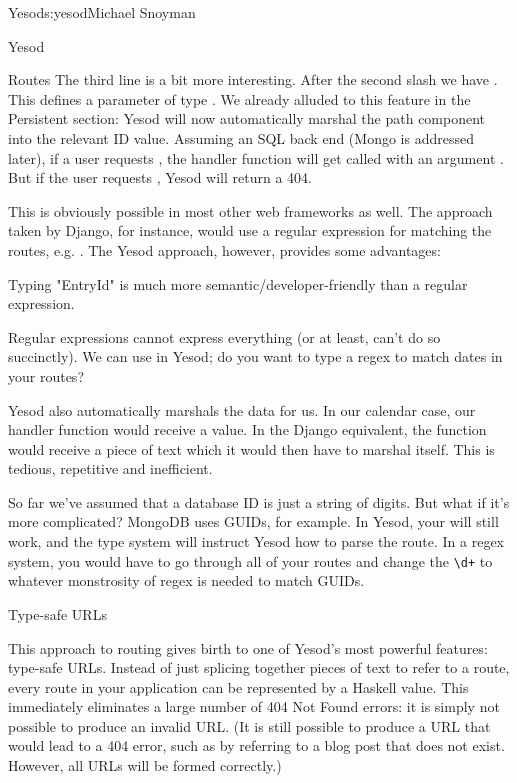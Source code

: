\begin{aosachapter}{Yesod}{s:yesod}{Michael Snoyman}
\begin{aosasect1}{Yesod}
\begin{aosasect2}{Routes}
The third line is a bit more interesting. After the second slash we
have . This defines a parameter of type
. We already alluded to this
feature in the Persistent section: Yesod will now automatically marshal the path component into
the relevant ID value. Assuming an SQL back end (Mongo is addressed
later), if a user requests , the handler function will
get called with an argument . But if the user requests
, Yesod will return a 404.

This is obviously possible in most other web frameworks as well. The
approach taken by Django, for instance, would use a regular expression
for matching the routes, e.g. . The Yesod
approach, however, provides some advantages:

\begin{aosaitemize}

\item Typing "EntryId" is much more semantic/developer-friendly than a
  regular expression.

\item Regular expressions cannot express everything (or at least,
  can't do so succinctly). We can use  in Yesod;
  do you want to type a regex to match dates in your routes?

\item Yesod also automatically marshals the data for us. In our
  calendar case, our handler function would receive a 
  value. In the Django equivalent, the function would receive a piece
  of text which it would then have to marshal itself. This is tedious,
  repetitive and inefficient.

\item So far we've assumed that a database ID is just a string of
  digits. But what if it's more complicated? MongoDB uses GUIDs, for
  example. In Yesod, your  will still work, and the type
  system will instruct Yesod how to parse the route. In a regex
  system, you would have to go through all of your routes and change
  the \verb=\d+= to whatever monstrosity of regex is needed to match GUIDs.

\end{aosaitemize}

\begin{aosasect3}{Type-safe URLs}

This approach to routing gives birth to one of Yesod's most powerful
features: type-safe URLs. Instead of just splicing together pieces of
text to refer to a route, every route in your application can be
represented by a Haskell value. This immediately eliminates a large
number of 404 Not Found errors: it is simply not possible to produce
an invalid URL.  (It is still possible to produce a URL that would lead to a 404 error, such as
by referring to a blog post that does not exist. However, all URLs
will be formed correctly.)


\end{aosasect3}
\end{aosasect2}
\end{aosasect1}
\end{aosachapter}
